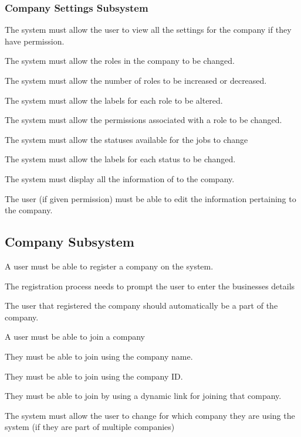 \documentclass{article}
\begin{document}
	\subsubsection*{Company Settings Subsystem}	
	\begin{list}{R.}{}
		\item The system must allow the user to view all the settings for the company if they have permission.
		\item The system must allow the roles in the company to be changed.
		\begin{list}{R.}{}
			\item The system must allow the number of roles to be increased or decreased.
			\item The system must allow the labels for each role to be altered.
			\item The system must allow the permissions associated with a role to be changed.
		\end{list}
		\item The system must allow the statuses available for the jobs to change
		\begin{list}{R.}{}
			\item The system must allow the labels for each status to be changed.
		\end{list}
		\item The system must display all the information of to the company.
		\item The user (if given permission) must be able to edit the information pertaining to the company.
	\end{list}
	
	\subsection*{Company Subsystem}	
	\begin{list}{R.}{}
		\item A user must be able to register a company on the system.
		\item The registration process needs to prompt the user to enter the businesses details
		\item The user that registered the company should automatically be a part of the company.
		\item A user must be able to join a company
		\begin{list}{R.}{}
			\item They must be able to join using the company name.
			\item They must be able to join using the company ID.
			\item They must be able to join by using a dynamic link for joining that company.
		\end{list} 
		\item The system must allow the user to change for which company they are using the system (if they are part of multiple companies)
	\end{list}
	
\end{document}
